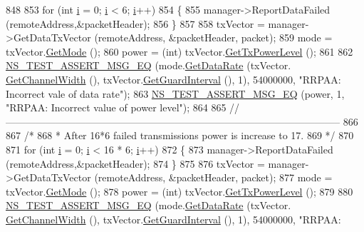 \begin{DoxyCode}
848 
853   \textcolor{keywordflow}{for} (\textcolor{keywordtype}{int} \hyperlink{bernuolliDistribution_8m_a6f6ccfcf58b31cb6412107d9d5281426}{i} = 0; \hyperlink{bernuolliDistribution_8m_a6f6ccfcf58b31cb6412107d9d5281426}{i} < 6; \hyperlink{bernuolliDistribution_8m_a6f6ccfcf58b31cb6412107d9d5281426}{i}++)
854     \{
855       manager->ReportDataFailed (remoteAddress,&packetHeader);
856     \}
857 
858   txVector = manager->GetDataTxVector (remoteAddress, &packetHeader, packet);
859   mode = txVector.\hyperlink{classns3_1_1WifiTxVector_a497b1f11cad4b8b26251dfa07c9ad1d6}{GetMode} ();
860   power = (int) txVector.\hyperlink{classns3_1_1WifiTxVector_a7c98bd9609ff1c5cefa6e22d6908a2fe}{GetTxPowerLevel} ();
861 
862   \hyperlink{group__testing_ga2a9d78cffb3db8e867c35fff0b698cf5}{NS\_TEST\_ASSERT\_MSG\_EQ} (mode.\hyperlink{classns3_1_1WifiMode_adcfbe150f69da720db23387f733b8a52}{GetDataRate} (txVector.
      \hyperlink{classns3_1_1WifiTxVector_a1f8bfa51778a3e217581eb665f059564}{GetChannelWidth} (), txVector.\hyperlink{classns3_1_1WifiTxVector_ab80c0fd812542ef337a6cace4f64db63}{GetGuardInterval} (), 1), 54000000, \textcolor{stringliteral}{"RRPAA:
       Incorrect vale of data rate"});
863   \hyperlink{group__testing_ga2a9d78cffb3db8e867c35fff0b698cf5}{NS\_TEST\_ASSERT\_MSG\_EQ} (power, 1, \textcolor{stringliteral}{"RRPAA: Incorrect value of power level"});
864 
865   \textcolor{comment}{//-----------------------------------------------------------------------------------------------------}
866 
867   \textcolor{comment}{/*}
868 \textcolor{comment}{   * After 16*6 failed transmissions power is increase to 17.}
869 \textcolor{comment}{   */}
870 
871   \textcolor{keywordflow}{for} (\textcolor{keywordtype}{int} \hyperlink{bernuolliDistribution_8m_a6f6ccfcf58b31cb6412107d9d5281426}{i} = 0; \hyperlink{bernuolliDistribution_8m_a6f6ccfcf58b31cb6412107d9d5281426}{i} < 16 * 6; \hyperlink{bernuolliDistribution_8m_a6f6ccfcf58b31cb6412107d9d5281426}{i}++)
872     \{
873       manager->ReportDataFailed (remoteAddress,&packetHeader);
874     \}
875 
876   txVector = manager->GetDataTxVector (remoteAddress, &packetHeader, packet);
877   mode = txVector.\hyperlink{classns3_1_1WifiTxVector_a497b1f11cad4b8b26251dfa07c9ad1d6}{GetMode} ();
878   power = (int) txVector.\hyperlink{classns3_1_1WifiTxVector_a7c98bd9609ff1c5cefa6e22d6908a2fe}{GetTxPowerLevel} ();
879 
880   \hyperlink{group__testing_ga2a9d78cffb3db8e867c35fff0b698cf5}{NS\_TEST\_ASSERT\_MSG\_EQ} (mode.\hyperlink{classns3_1_1WifiMode_adcfbe150f69da720db23387f733b8a52}{GetDataRate} (txVector.
      \hyperlink{classns3_1_1WifiTxVector_a1f8bfa51778a3e217581eb665f059564}{GetChannelWidth} (), txVector.\hyperlink{classns3_1_1WifiTxVector_ab80c0fd812542ef337a6cace4f64db63}{GetGuardInterval} (), 1), 54000000, \textcolor{stringliteral}{"RRPAA:
}
\end{DoxyCode}
